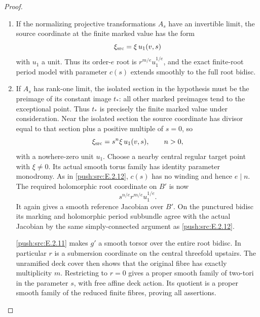 \begin{proof}
\begin{enumerate}[label={$\langle1\rangle$\arabic*.},leftmargin=*]
\item If the normalizing projective transformations
$A_s$ have an invertible limit, the source
coordinate at the finite marked value has
the form
\[
 \xi_{\rm src}=\xi\,u_1(v,s)
\]
with $u_1$ a unit.  Thus its order-$e$ root
is $r^{m/e}u_1^{1/e}$, and the exact finite-root
period model with parameter $c(s)$ extends
smoothly to the full root bidisc.

\item If $A_s$ has rank-one limit, the isolated
section in the hypothesis must be the
preimage of its constant image $t_*$:
all other marked preimages tend to the
exceptional point.  Thus $t_*$ is precisely
the finite marked value under consideration.
Near the isolated section the source
coordinate has divisor equal to that section
plus a positive multiple of $s=0$, so
\[
 \xi_{\rm src}=s^n\xi\,u_1(v,s),\qquad n>0,
\]
with a nowhere-zero unit $u_1$.  Choose a
nearby central regular target point with
$\xi\ne0$.  Its actual smooth torus family
has identity parameter monodromy.  As in
\ref{push:src:E.2.12}, $c(s)$ has no winding and hence
$e\mid n$.  The required holomorphic root
coordinate on $B'$ is now
\[
 s^{n/e}r^{m/e}u_1^{1/e}.
\]
It again gives a smooth reference Jacobian
over $B'$.  On the punctured bidisc its
marking and holomorphic period subbundle
agree with the actual Jacobian by the same
simply-connected argument as \ref{push:src:E.2.12}.

\ref{push:src:E.2.11} makes $g'$ a smooth torsor over the
entire root bidisc.  In particular $r$ is
a submersion coordinate on the central
threefold upstairs.  The unramified deck
cover then shows that the original fibre
has exactly multiplicity $m$.  Restricting
to $r=0$ gives a proper smooth family of
two-tori in the parameter $s$, with free
affine deck action.  Its quotient is a
proper smooth family of the reduced finite
fibres, proving all assertions.

\end{enumerate}
\end{proof}

